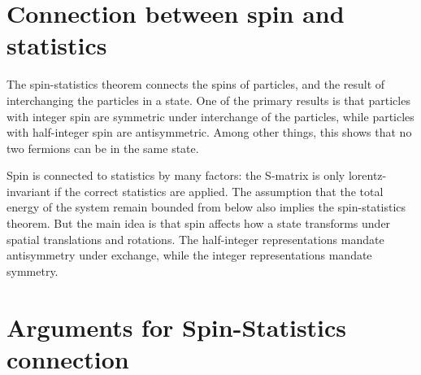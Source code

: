 \documentclass{article}
\begin{document}
\section{Connection between spin and statistics}

The spin-statistics theorem connects the spins of particles,
	and the result of interchanging the particles in a state.
One of the primary results is that particles with integer
	spin are symmetric under interchange of the particles,
	while particles with half-integer spin are antisymmetric.
Among other things, this shows that no two fermions can be
	in the same state.

Spin is connected to statistics by many factors:
	the S-matrix is only lorentz-invariant if the correct 
	statistics are applied.
The assumption that the total energy of the system remain
	bounded from below also implies the spin-statistics
	theorem.
But the main idea is that spin affects how a state
	transforms under spatial translations and rotations.
The half-integer representations mandate antisymmetry
	under exchange, while the integer representations
	mandate symmetry.

\section{Arguments for Spin-Statistics connection}
\end{document}
